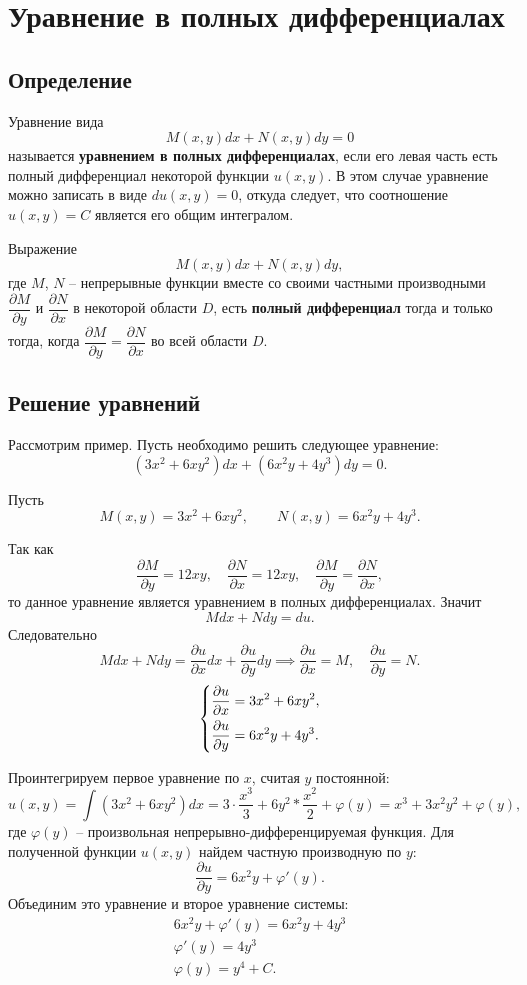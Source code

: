 \documentclass[a5paper, 11pt]{extbook}
\theoremstyle{definition}
\theoremstyle{definition}
\theoremstyle{definition}
\begin{document}
\section{Уравнение в полных дифференциалах}

\subsection{Определение}

Уравнение вида
\[
    M(x, y) dx + N(x, y)dy = 0
\]
называется \textbf{уравнением в полных дифференциалах}, если его левая часть есть полный дифференциал некоторой функции \(u(x, y)\). В этом случае уравнение можно записать в виде \(du(x, y) = 0\), откуда следует, что соотношение \(u(x, y) = C\) является его общим интегралом.

Выражение
\[
    M(x, y)dx + N(x, y)dy,
\]
где \(M\), \(N\) -- непрерывные функции вместе со своими частными производными \(\dfrac{\partial M}{\partial y}\) и \(\dfrac{\partial N}{\partial x}\) в некоторой области \(D\), есть \textbf{полный дифференциал} тогда и только тогда, когда \(\dfrac{\partial M}{\partial y} = \dfrac{\partial N}{\partial x}\) во всей области \(D\).

\subsection{Решение уравнений}

Рассмотрим пример. Пусть необходимо решить следующее уравнение:
\[
    (3x^2 + 6xy^2) dx + (6x^2y + 4y^3) dy = 0.
\]

Пусть
\[
    M(x, y) = 3x^2 + 6xy^2,
    \qquad
    N(x, y) = 6x^2y + 4y^3.
\]

Так как
\[
    \frac{\partial M}{\partial y} = 12xy,
    \quad
    \frac{\partial N}{\partial x} = 12xy,
    \quad
    \frac{\partial M}{\partial y} = \frac{\partial N}{\partial x},
\]
то данное уравнение является уравнением в полных дифференциалах. Значит
\[
    Mdx + Ndy = du.
\]
Следовательно
\[
    Mdx + Ndy = \frac{\partial u}{\partial x} dx + \frac{\partial u}{\partial y}dy
    \implies
    \frac{\partial u}{\partial x} = M,
    \quad
    \frac{\partial u}{\partial y} = N.
\]
\[
    \begin{dcases}
        \frac{\partial u}{\partial x} = 3x^2 + 6xy^2, \\
        \frac{\partial u}{\partial y} = 6x^2y + 4y^3.
    \end{dcases}
\]

Проинтегрируем первое уравнение по \(x\), считая \(y\) постоянной:
\[
    u(x, y) =
    \int (3x^2 + 6xy^2)dx =
    3 \cdot \frac{x^3}{3} + 6y^2 * \frac{x^2}{2} + \varphi(y) =
    x^3 + 3x^2y^2 + \varphi(y),
\]
где \(\varphi(y)\) -- произвольная непрерывно-дифференцируемая функция. Для полученной функции \(u(x, y)\) найдем частную производную по \(y\):
\[
    \frac{\partial u}{\partial y} = 6x^2y + \varphi'(y).
\]
Объединим это уравнение и второе уравнение системы:
\begin{gather*}
    6x^2y + \varphi'(y) = 6x^2y + 4y^3 \\
    \varphi'(y) = 4y^3 \\
    \varphi(y) = y^4 + C.
\end{gather*}
\end{document}
